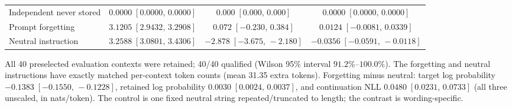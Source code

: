 \begin{table}[t]
\begin{tabular}{lccc}
Independent never stored & $0.0000\;[0.0000,\,0.0000]$ & $0.000\;[0.000,\,0.000]$ & $0.0000\;[0.0000,\,0.0000]$ \\
Prompt forgetting & $3.1205\;[2.9432,\,3.2908]$ & $0.072\;[-0.230,\,0.384]$ & $0.0124\;[-0.0081,\,0.0339]$ \\
Neutral instruction & $3.2588\;[3.0801,\,3.4306]$ & $-2.878\;[-3.675,\,-2.180]$ & $-0.0356\;[-0.0591,\,-0.0118]$ \\
\hline
\end{tabular}
\par\vspace{3pt}
\begin{minipage}{0.98\textwidth}\footnotesize
All 40 preselected evaluation contexts were retained; 40/40 qualified (Wilson 95\% interval $91.2\%$--$100.0\%$). The forgetting and neutral instructions have exactly matched per-context token counts (mean 31.35 extra tokens). Forgetting minus neutral: target log probability $-0.1383\;[-0.1550,\,-0.1228]$, retained log probability $0.0030\;[0.0024,\,0.0037]$, and continuation NLL $0.0480\;[0.0231,\,0.0733]$ (all three unscaled, in nats/token). The control is one fixed neutral string repeated/truncated to length; the contrast is wording-specific.
\end{minipage}
\end{table}

